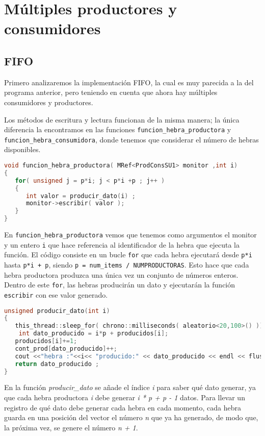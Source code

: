 \documentclass{article}
\begin{document}
\section{Múltiples productores y consumidores}

\subsection{FIFO}
Primero analizaremos la implementación FIFO, la cual es muy parecida a la del programa anterior, pero teniendo en cuenta que ahora hay múltiples consumidores y productores.

Los métodos de escritura y lectura funcionan de la misma manera; la única diferencia la encontramos en las funciones \texttt{funcion\_hebra\_productora} y \texttt{funcion\_hebra\_consumidora}, donde tenemos que considerar el número de hebras disponibles.

\begin{lstlisting}[language=C++,caption=función hebra productora ] 
void funcion_hebra_productora( MRef<ProdConsSU1> monitor ,int i)
{
   for( unsigned j = p*i; j < p*i +p ; j++ )
   {
      int valor = producir_dato(i) ;
      monitor->escribir( valor );
   }
}
\end{lstlisting}
En \texttt{funcion\_hebra\_productora} vemos que tenemos como argumentos el monitor y un entero \texttt{i} que hace referencia al identificador de la hebra que ejecuta la función. El código consiste en un bucle \texttt{for} que cada hebra ejecutará desde \texttt{p*i} hasta \texttt{p*i + p}, siendo \texttt{p = num\_items / NUMPRODUCTORAS}. Esto hace que cada hebra productora produzca una única vez un conjunto de números enteros. Dentro de este \texttt{for}, las hebras producirán un dato y ejecutarán la función \texttt{escribir} con ese valor generado.


\begin{lstlisting}[language=C++,caption=función producir dato para varias hebras ] 
unsigned producir_dato(int i)
{
   this_thread::sleep_for( chrono::milliseconds( aleatorio<20,100>() ));
	int dato_producido = i*p + producidos[i];
   producidos[i]+=1;
   cont_prod[dato_producido]++;
   cout <<"hebra :"<<i<< "producido:" << dato_producido << endl << flush ;
   return dato_producido ;
}
\end{lstlisting}
En la función \textit{producir\_dato} se añade el índice \textit{i} para saber qué dato generar, ya que cada hebra productora \textit{i} debe generar \textit{i * p + p - 1} datos. Para llevar un registro de qué dato debe generar cada hebra en cada momento, cada hebra guarda en una posición del vector el número \textit{n} que ya ha generado, de modo que, la próxima vez, se genere el número \textit{n + 1}.
\end{document}

